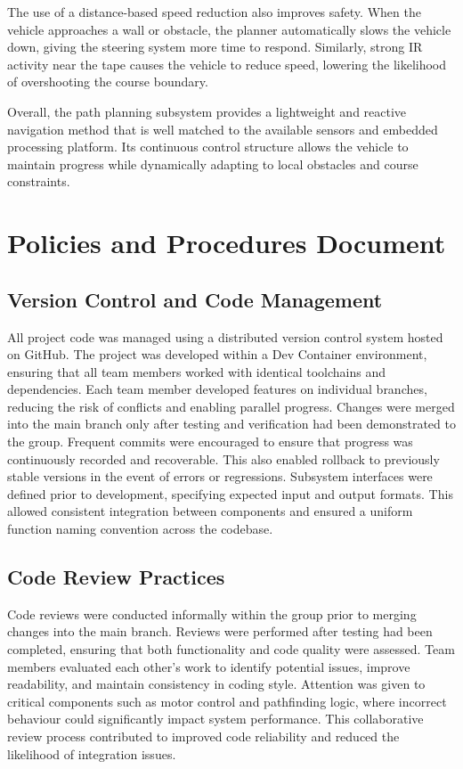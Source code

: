 The use of a distance-based speed reduction also improves safety. When the vehicle approaches a wall or obstacle, the planner automatically slows the vehicle down, giving the steering system more time to respond. Similarly, strong IR activity near the tape causes the vehicle to reduce speed, lowering the likelihood of overshooting the course boundary.

Overall, the path planning subsystem provides a lightweight and reactive navigation method that is well matched to the available sensors and embedded processing platform. Its continuous control structure allows the vehicle to maintain progress while dynamically adapting to local obstacles and course constraints.

\section{Policies and Procedures Document}

\subsection{Version Control and Code Management}
All project code was managed using a distributed version control system hosted on GitHub. The project was developed within a Dev Container environment, ensuring that all team members worked with identical toolchains and dependencies.
Each team member developed features on individual branches, reducing the risk of conflicts and enabling parallel progress. Changes were merged into the main branch only after testing and verification had been demonstrated to the group.
Frequent commits were encouraged to ensure that progress was continuously recorded and recoverable. This also enabled rollback to previously stable versions in the event of errors or regressions.
Subsystem interfaces were defined prior to development, specifying expected input and output formats. This allowed consistent integration between components and ensured a uniform function naming convention across the codebase.

\subsection{Code Review Practices}
Code reviews were conducted informally within the group prior to merging changes into the main branch. Reviews were performed after testing had been completed, ensuring that both functionality and code quality were assessed.
Team members evaluated each other’s work to identify potential issues, improve readability, and maintain consistency in coding style. Attention was given to critical components such as motor control and pathfinding logic, where incorrect behaviour could significantly impact system performance.
This collaborative review process contributed to improved code reliability and reduced the likelihood of integration issues.

